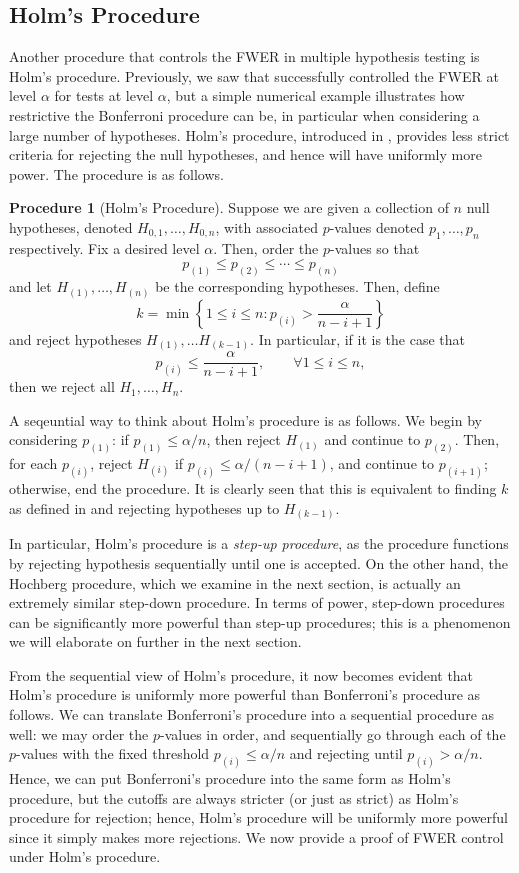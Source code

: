 \documentclass[11pt,reqno]{report}
\theoremstyle{definition}
\newtheorem{proc}[theorem]{Procedure}
\numberwithin{equation}{section}
\begin{document}
\subsection{Holm's Procedure}
Another procedure that controls the FWER in multiple hypothesis testing is Holm's procedure. Previously, we saw that  successfully controlled the FWER at level $\alpha$ for tests at level $\alpha$, but a simple numerical example illustrates how restrictive the Bonferroni procedure can be, in particular when considering a large number of hypotheses. Holm's procedure, introduced in \cite{holms}, provides less strict criteria for rejecting the null hypotheses, and hence will have uniformly more power. The procedure is as follows.
\begin{proc}[Holm's Procedure]
\label{holmproc}
Suppose we are given a collection of $n$ null hypotheses, denoted $H_{0, 1}, \ldots, H_{0, n}$, with associated $p$-values denoted $p_1, \ldots, p_n$ respectively. Fix a desired level $\alpha$. Then, order the $p$-values so that
\[ p_{(1)} \leq p_{(2)} \leq \cdots \leq p_{(n)} \] and let $H_{(1)}, \ldots, H_{(n)}$ be the corresponding hypotheses. Then, define
\[ k = \min \left\{ 1 \leq i \leq n : p_{(i)} > \frac{\alpha}{n - i + 1} \right \}  \] and reject hypotheses $H_{(1)}, \ldots H_{(k-1)}$. In particular, if it is the case that 
\[ p_{(i)} \leq \frac{\alpha}{n - i + 1}, \qquad \forall 1 \leq i \leq n, \] then we reject all $H_1, \ldots, H_n$.
\end{proc}
\begin{note*}
A seqeuntial way to think about Holm's procedure is as follows. We begin by considering $p_{(1)}$: if $p_{(1)} \leq \alpha / n$, then reject $H_{(1)}$ and continue to $p_{(2)}$. Then, for each $p_{(i)}$, reject $H_{(i)}$ if $p_{(i)} \leq \alpha / (n - i + 1)$, and continue to $p_{(i+1)}$; otherwise, end the procedure. It is clearly seen that this is equivalent to finding $k$ as defined in  and rejecting hypotheses up to $H_{(k-1)}$.

In particular, Holm's procedure is a \emph{step-up procedure}, as the procedure functions by rejecting hypothesis sequentially until one is accepted. On the other hand, the Hochberg procedure, which we examine in the next section, is actually an extremely similar step-down procedure. In terms of power, step-down procedures can be significantly more powerful than step-up procedures; this is a phenomenon we will elaborate on further in the next section.
\end{note*}
From the sequential view of Holm's procedure, it now becomes evident that Holm's procedure is uniformly more powerful than Bonferroni's procedure as follows. We can translate Bonferroni's procedure into a sequential procedure as well: we may order the $p$-values in order, and sequentially go through each of the $p$-values with the fixed threshold $p_{(i)} \leq \alpha / n$ and rejecting until $p_{(i)} > \alpha / n$. Hence, we can put Bonferroni's procedure into the same form as Holm's procedure, but the cutoffs are always stricter (or just as strict) as Holm's procedure for rejection; hence, Holm's procedure will be uniformly more powerful since it simply makes more rejections. We now provide a proof of FWER control under Holm's procedure.
\end{document}
